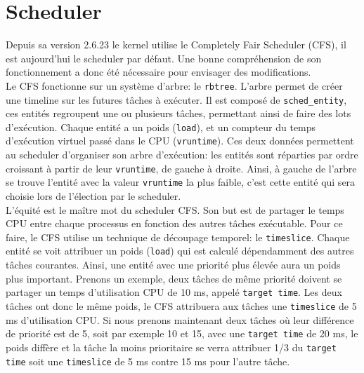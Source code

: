 \section*{Scheduler}

Depuis sa version 2.6.23 le kernel utilise le Completely Fair Scheduler (CFS),
il est aujourd'hui le scheduler par défaut. Une bonne compréhension de son
fonctionnement a donc été nécessaire pour envisager des modifications.
\\

Le CFS fonctionne sur un système d'arbre: le \verb|rbtree|. L'arbre permet de
créer une timeline sur les futures tâches à exécuter.
Il est composé de \verb|sched_entity|, ces entités regroupent une ou plusieurs
tâches, permettant ainsi de faire des lots d'exécution. Chaque entité a un
poids (\verb|load|), et un compteur du temps d'exécution virtuel passé dans le
CPU (\verb|vruntime|). Ces deux données permettent au scheduler d'organiser son
arbre d'exécution: les entités sont réparties par ordre croissant à partir de
leur \verb|vruntime|, de gauche à droite. Ainsi, à gauche de l'arbre se trouve
l'entité avec la valeur \verb|vruntime| la plus faible, c'est cette entité qui
sera choisie lors de l'élection par le scheduler.
\\

L'équité est le maître mot du scheduler CFS. Son but est de partager le temps 
CPU entre chaque processus en fonction des autres tâches exécutable. Pour ce 
faire, le CFS utilise un technique de découpage temporel: le \verb|timeslice|.
 Chaque entité se voit attribuer un poids (\verb|load|) qui est calculé 
 dépendamment des autres tâches courantes. Ainsi, une entité avec une priorité 
 plus élevée aura un poids plus important. Prenons un exemple, deux tâches de 
 même priorité doivent se partager un temps d'utilisation CPU de 10 ms, appelé 
 \verb|target time|. Les deux tâches ont donc le même poids, le CFS attribuera 
 aux tâches une \verb|timeslice| de 5 ms d'utilisation CPU. Si nous prenons 
 maintenant deux tâches où leur différence de priorité est de 5, soit par 
 exemple 10 et 15, avec une \verb|target time| de 20 ms, le poids diffère et la 
 tâche la moins prioritaire se verra attribuer 1/3 du \verb|target time| soit 
 une \verb|timeslice| de 5 ms contre 15 ms pour l'autre tâche.

\\

